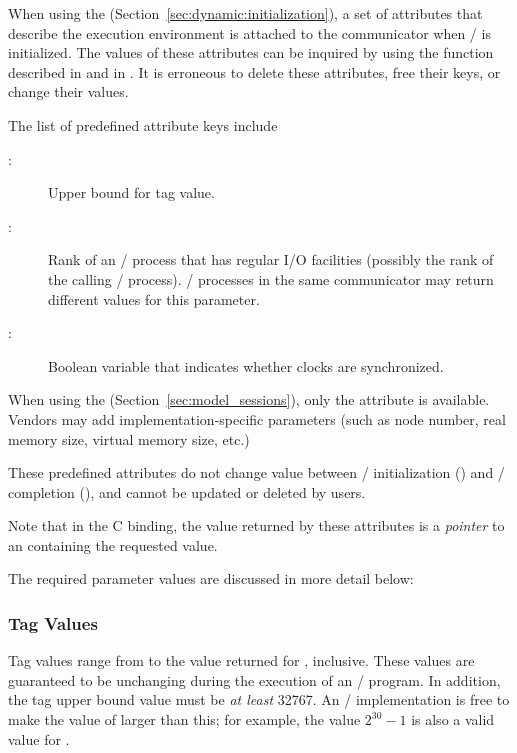When using the \wpm{}\mpitermindex{\wpm} (Section~\ref{sec:dynamic:initialization}),
a set of attributes that describe the execution environment is attached to
the communicator  when \MPI/ is initialized.
The values of these attributes can be inquired by using the function
described in 
 and in .
It is erroneous to delete these attributes,
free their keys, or change their values.

The list of predefined attribute keys include
\begin{description}
\item[:]  Upper bound for tag value.
\item[:] Rank of an \mpi/ process that has regular I/O facilities (possibly
the rank of the calling \mpi/ process).  \mpi/ processes in the same communicator may return different values for this
parameter.
\item[:] Boolean variable that indicates
whether clocks are synchronized.
\end{description}

When using the \spm{}\mpitermindex{\spm} (Section~\ref{sec:model_sessions}),
only the  attribute is available.
%
Vendors may add implementation-specific parameters (such as node number,
real memory size, virtual memory size, etc.)

These predefined attributes do not change value between \MPI/
initialization () and \MPI/ completion
(), and cannot be updated or deleted by users.

\begin{users}
Note that in the C binding, the value returned by these attributes is a 
\emph{pointer} to an  containing the requested value.
\end{users}

The required parameter values are discussed in more detail below:

\subsubsection{Tag Values}
Tag values range from  to the value returned for ,
inclusive.
These values are guaranteed to be unchanging during the execution of an \MPI/
program.
In addition, the tag upper bound value must be \emph{at least} 32767.
An \MPI/ implementation is free to make the value of  larger
than this;
for example, the value \(2^{30}-1\) is also a valid value for
.

